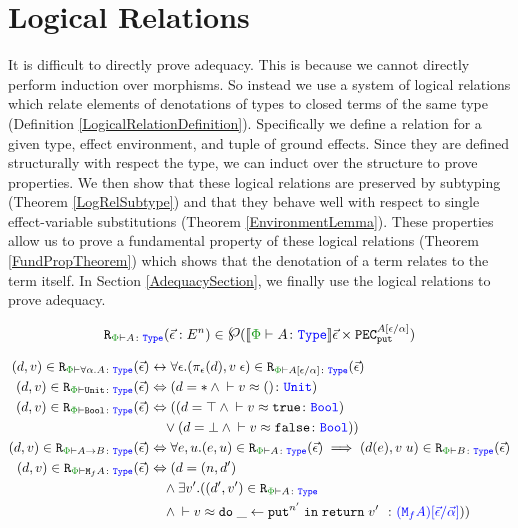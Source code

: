\section{Logical Relations}
It is difficult to directly prove adequacy. This is because we cannot directly perform induction over morphisms. So instead we use a system of logical relations which relate elements of denotations of types to closed terms of the same type (Definition \ref{LogicalRelationDefinition}). Specifically we define a relation for a given type, effect environment, and tuple of ground effects. Since they are defined structurally with respect the type, we can induct over the structure to prove properties. We then show that these logical relations are preserved by subtyping (Theorem \ref{LogRelSubtype}) and that they behave well with respect to single effect-variable substitutions (Theorem \ref{EnvironmentLemma}). These properties allow us to prove a fundamental property of these logical relations (Theorem \ref{FundPropTheorem}) which shows that the denotation of a term relates to the term itself. In Section \ref{AdequacySection}, we finally use the logical relations to prove adequacy.

\begin{framed}
    \begin{definition}\label{LogicalRelationDefinition}
        \begin{equation}
            \label{LogicalRelationType}
            \erelates{\P}{A}(\ev: E^n) \in \powset{\deno{\wellformedt{\P}{A}}\ev\times \pecput^{A\ssub{\a}{\e}}}
        \end{equation}
   
        \begin{align*}
                    (d, v)\in\erelates{\P}{\all{\a}{A}}(\ev) & \leftrightarrow \forall\e. (\pe(d), \eapp{v}{\e})\in\erelates{\P}{A\ssub{\a}{\e}}(\ev)\\
                    (d, v)\in\erelates{\P}{\U}(\ev) & \Leftrightarrow (d=\singleton \wedge \zberelation{v}{()}{\U})
                    \\
                    (d, v)\in\erelates{\P}{\B}(\ev) & \Leftrightarrow ((d=\top \wedge \zberelation{v}{\t}{\B}) 
                    \\& \quad\vee (d=\bot \wedge \zberelation{v}{\f}{\B}))
                    \\
                    (d, v)\in\erelates{\P}{\ab}(\ev)  &\Leftrightarrow \forall e, u. (e, u)\in\erelates{\P}{A}(\ev) \implies (d(e), \apply{v}{u})\in \erelates{\P}{B}(\ev)
                    \\
                    (d, v)\in\erelates{\P}{\M{f}{A}}(\ev) &\Leftrightarrow (d= (n, d')
                    \\ & \quad\wedge \exists v'. ((d', v')\in\erelates{\P}{A}
                    \\ & \quad\wedge  \zberelation{v}{\doin{\_}{\put^{n'}}{\return{v'}}}{(\M{f}{A})\ssub{\av}{\ev}}))
        \end{align*}
    \end{definition}
        
\end{framed}

